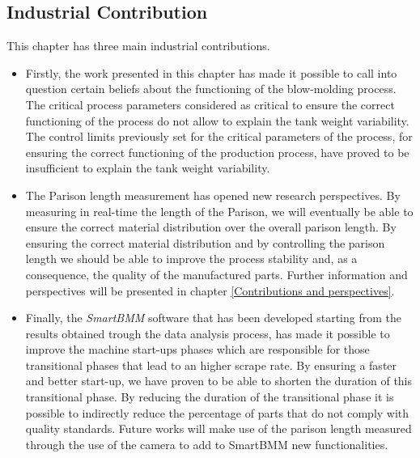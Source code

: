 \subsection{Industrial Contribution}

This chapter has three main industrial contributions.
\begin{itemize}
    \item Firstly, the work presented in this chapter has made it possible to call into question certain beliefs about the functioning of the blow-molding process. The critical process parameters considered as critical to ensure the correct functioning of the process do not allow to explain the tank weight variability. The control limits previously set for the critical parameters of the process, for ensuring the correct functioning of the production process, have proved to be insufficient to explain the tank weight variability.
    \item The Parison length measurement has opened new research perspectives. By measuring in real-time the length of the Parison, we will eventually be able to ensure the correct material distribution over the overall parison length. By ensuring the correct material distribution and by controlling the parison length we should be able to improve the process stability and, as a consequence, the quality of the manufactured parts. Further information and perspectives will be presented in chapter \ref{Contributions and perspectives}.
    \item Finally, the \textit{SmartBMM} software that has been developed starting from the results obtained trough the data analysis process, has made it possible to improve the machine start-ups phases which are responsible for those transitional phases that lead to an higher scrape rate. By ensuring a faster and better start-up, we have proven to be able to shorten the duration of this transitional phase. By reducing the duration of the transitional phase it is possible to indirectly reduce the percentage of parts that do not comply with quality standards. Future works will make use of the parison length measured through the use of the camera to add to SmartBMM new functionalities.  
\end{itemize}


